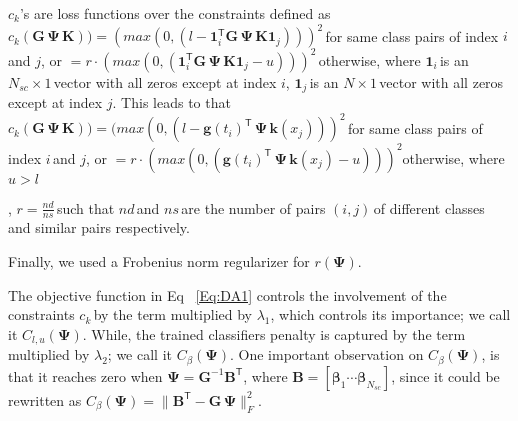 \small$c_k$\normalsize's are loss functions over the constraints defined as
  \small$c_k(\mathbf{G}\, {\mathbf{\Psi}}\, \mathbf{K})) = (max(0, (l-\textbf{1}_i^\textsf{T} \mathbf{G}\, {\mathbf{\Psi}}\, \mathbf{K} \textbf{1}_j) ))^2\,$\normalsize for same class pairs of index \small$i\,$\normalsize and \small$j$\normalsize,  or \small$ =r\cdot(max(0, (\textbf{1}_i^\textsf{T} \mathbf{G}\, {\mathbf{\Psi}}\, \mathbf{K} \textbf{1}_j -u) ))^ 2\,$\normalsize otherwise, where \small$\textbf{1}_i\,$\normalsize is an \small$N_{sc} \times 1\,$\normalsize vector with all zeros except at index \small$i$\normalsize, \small$\textbf{1}_j\,$\normalsize is an \small$N \times 1\,$\normalsize vector with all zeros except at index \small$j$\normalsize. This leads to that   \small$ c_k(\mathbf{G}\, {\mathbf{\Psi}}\, \mathbf{K})) = (max(0, (l-\textbf{g}(t_i)^\textsf{T}\, {\mathbf{\Psi}}\, \textbf{k}(x_j) ))^2\,$\normalsize for same class pairs of index \small$i\,$\normalsize and \small$j$\normalsize, or \small$ =r\cdot(max(0, (\textbf{g}(t_i)^\textsf{T}\, {\mathbf{\Psi}}\,\textbf{k}(x_j) -u) ))^ 2$\normalsize otherwise, where \small$u>l$\normalsize{}, \small$r = \frac{nd}{ns}\,$\normalsize such that \small$nd\,$\normalsize and \small$ns\,$\normalsize are the number of pairs \small$(i,j)\,$\normalsize of different classes and similar pairs respectively.  Finally, we used a Frobenius norm regularizer for \small$r({\mathbf{\Psi}})$\normalsize. 


The objective function in Eq ~\ref{Eq:DA1}  controls the involvement of the constraints \small$c_k\,$\normalsize by the term multiplied by \small$\lambda_1$\normalsize, which controls its importance; we call it \small$C_{l,u}({\mathbf{\Psi}})$\normalsize. While, the trained classifiers penalty is captured by the term multiplied by \small$\lambda_2$\normalsize; we call it \small$C_{\beta}({\mathbf{\Psi}})$\normalsize. One important observation on  \small$C_{\beta}({\mathbf{\Psi}})$\normalsize, is that it reaches zero when \small${\mathbf{\Psi}} = \mathbf{G}^{-1} \textbf{B}^\mathsf{T}$\normalsize, where \small$\textbf{B}  = [\boldsymbol{\beta}_1 \cdots \boldsymbol{\beta}_{N_{sc}}]$\normalsize, since it could be rewritten as \small$C_{\beta}({\mathbf{\Psi}}) = \|\textbf{B}^\mathsf{T} - \mathbf{G} \, {\mathbf{\Psi}}  \|_{F}^2$\normalsize.

